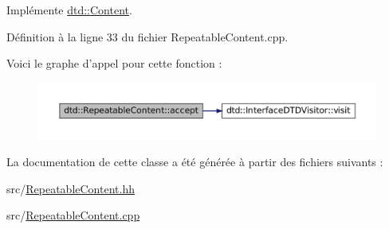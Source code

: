 Implémente \hyperlink{classdtd_1_1_content_a403cc15f12eaa187ad493fa600540cd8}{dtd::Content}.



Définition à la ligne 33 du fichier RepeatableContent.cpp.



Voici le graphe d'appel pour cette fonction :\nopagebreak
\begin{figure}[H]
\begin{center}
\leavevmode
\includegraphics[width=400pt]{classdtd_1_1_repeatable_content_a28550745ec781816e4be44165dbb3934_cgraph}
\end{center}
\end{figure}




La documentation de cette classe a été générée à partir des fichiers suivants :\begin{DoxyCompactItemize}
\item 
src/\hyperlink{_repeatable_content_8hh}{RepeatableContent.hh}\item 
src/\hyperlink{_repeatable_content_8cpp}{RepeatableContent.cpp}\end{DoxyCompactItemize}
